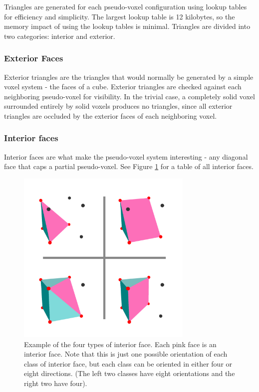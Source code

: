 Triangles are generated for each pseudo-voxel configuration using lookup tables for efficiency and simplicity.
The largest lookup table is 12 kilobytes, so the memory impact of using the lookup tables is minimal.
Triangles are divided into two categories: interior and exterior.

\subsubsection{Exterior Faces}

Exterior triangles are the triangles that would normally be generated by a simple voxel system - the faces of a cube.
Exterior triangles are checked against each neighboring pseudo-voxel for visibility.
In the trivial case, a completely solid voxel surrounded entirely by solid voxels produces no triangles, since all exterior triangles are occluded by the exterior faces of each neighboring voxel.

\subsubsection{Interior faces}

Interior faces are what make the pseudo-voxel system interesting - any diagonal face that caps a partial pseudo-voxel.
See Figure \ref{fig:interiorfaces2} for a table of all interior faces.

\begin{figure}
	\centering
		\includegraphics[width=0.75\textwidth]{figures/interiorfaces2.png}
	\caption{
		Example of the four types of interior face.
		Each pink face is an interior face.
		Note that this is just one possible orientation of each class of interior face, but each class can be oriented in either four or eight directions.
		(The left two classes have eight orientations and the right two have four).
	}
	\label{fig:interiorfaces2}
\end{figure}

